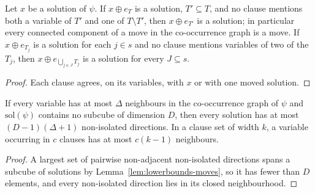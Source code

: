 \begin{lemma}[Moves]
  \label{lem:lowerbounds-moves}
  \leanok
  Let $x$ be a solution of $\psi$. If $x\oplus e_T$ is a solution, $T'\subseteq T$,
  and no clause mentions both a variable of $T'$ and one of $T\setminus T'$,
  then $x\oplus e_{T'}$ is a solution; in particular every connected component of
  a move in the co-occurrence graph is a move. If $x\oplus e_{T_j}$ is a solution
  for each $j\in s$ and no clause mentions variables of two of the $T_j$, then
  $x\oplus e_{\bigcup_{j\in J}T_j}$ is a solution for every $J\subseteq s$.
\end{lemma}
\begin{proof}
  \leanok
  Each clause agrees, on its variables, with $x$ or with one moved solution.
\end{proof}

\begin{lemma}
  \label{lem:lowerbounds-far-isolation}
  \leanok
  If every variable has at most $\Delta$ neighbours in the co-occurrence graph of
  $\psi$ and $\mathrm{sol}(\psi)$ contains no subcube of dimension $D$, then every
  solution has at most $(D-1)(\Delta+1)$ non-isolated directions. In a clause set
  of width $k$, a variable occurring in $c$ clauses has at most $c(k-1)$
  neighbours.
\end{lemma}
\begin{proof}
  \leanok
  A largest set of pairwise non-adjacent non-isolated directions spans a subcube
  of solutions by Lemma~\ref{lem:lowerbounds-moves}, so it has fewer than $D$
  elements, and every non-isolated direction lies in its closed neighbourhood.
\end{proof}

